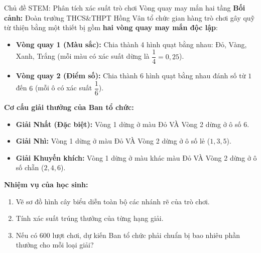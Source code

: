 \documentclass[12pt, a4paper]{article}
\begin{document}
\begin{stembox}{Chủ đề STEM: Phân tích xác suất trò chơi Vòng quay may mắn hai tầng}
\textbf{Bối cảnh:} Đoàn trường THCS\&THPT Hồng Vân tổ chức gian hàng trò chơi gây quỹ từ thiện bằng một thiết bị gồm \textbf{hai vòng quay may mắn độc lập}:
\begin{itemize}[leftmargin=0.5cm]
    \item \textbf{Vòng quay 1 (Màu sắc):} Chia thành 4 hình quạt bằng nhau: Đỏ, Vàng, Xanh, Trắng (mỗi màu có xác suất dừng là $\dfrac{1}{4} = 0{,}25$).
    \item \textbf{Vòng quay 2 (Điểm số):} Chia thành 6 hình quạt bằng nhau đánh số từ $1$ đến $6$ (mỗi ô có xác suất $\dfrac{1}{6}$).
\end{itemize}
\textbf{Cơ cấu giải thưởng của Ban tổ chức:}
\begin{itemize}[leftmargin=0.5cm]
    \item \textbf{Giải Nhất (Đặc biệt):} Vòng 1 dừng ở màu Đỏ VÀ Vòng 2 dừng ở ô số 6.
    \item \textbf{Giải Nhì:} Vòng 1 dừng ở màu Đỏ VÀ Vòng 2 dừng ở ô số lẻ ($1, 3, 5$).
    \item \textbf{Giải Khuyến khích:} Vòng 1 dừng ở màu khác màu Đỏ VÀ Vòng 2 dừng ở ô số chẵn ($2, 4, 6$).
\end{itemize}
\textbf{Nhiệm vụ của học sinh:}
\begin{enumerate}[leftmargin=0.6cm]
    \item Vẽ sơ đồ hình cây biểu diễn toàn bộ các nhánh rẽ của trò chơi.
    \item Tính xác suất trúng thưởng của từng hạng giải.
    \item Nếu có $600$ lượt chơi, dự kiến Ban tổ chức phải chuẩn bị bao nhiêu phần thưởng cho mỗi loại giải?
\end{enumerate}
\end{stembox}
\end{document}
